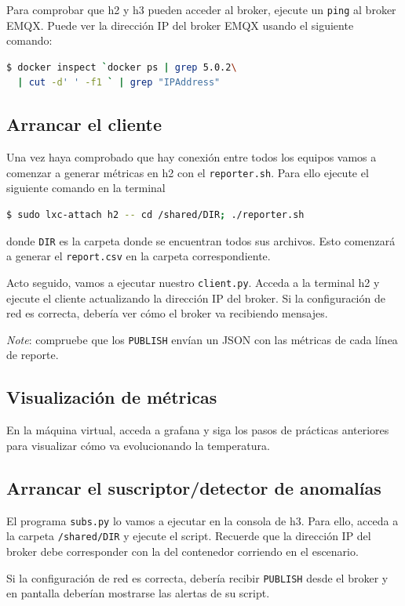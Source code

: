 \documentclass{upmassignment}
\begin{document}
Para comprobar que h2 y h3 pueden
acceder al broker,
ejecute un \texttt{ping}
al broker EMQX.
Puede ver la dirección IP del broker
EMQX usando el siguiente comando:
\begin{lstlisting}[language=bash]
$ docker inspect `docker ps | grep 5.0.2\
  | cut -d' ' -f1 ` | grep "IPAddress"
\end{lstlisting}



\subsection*{Arrancar el cliente}
Una vez haya comprobado que hay
conexión entre todos los equipos
vamos a comenzar a generar métricas en h2
con el \texttt{reporter.sh}.
Para ello ejecute el siguiente comando
en la terminal
\begin{lstlisting}[language=bash]
$ sudo lxc-attach h2 -- cd /shared/DIR; ./reporter.sh
\end{lstlisting}
donde \texttt{DIR} es la carpeta donde
se encuentran todos sus archivos.
Esto comenzará a generar el
\texttt{report.csv} en la carpeta 
correspondiente.

Acto seguido, vamos a ejecutar nuestro
\texttt{client.py}. Acceda a la terminal
h2 y ejecute el cliente actualizando
la dirección IP del broker.
Si la configuración de red es correcta,
debería ver cómo el broker va recibiendo
mensajes.

\emph{Note}: compruebe que los
\texttt{PUBLISH} envían un JSON con
las métricas de cada línea de reporte.


\subsection*{Visualización de métricas}
En la máquina virtual, acceda a grafana
y siga los pasos de prácticas anteriores
para visualizar cómo va evolucionando
la temperatura.


\subsection*{Arrancar el
suscriptor/detector de anomalías}
El programa \texttt{subs.py} lo vamos
a ejecutar en la consola de h3.
Para ello, acceda a la carpeta
\texttt{/shared/DIR} y ejecute el
script. Recuerde que la dirección IP del
broker debe corresponder con la del
contenedor corriendo en el escenario.

Si la configuración de red es correcta,
debería recibir \texttt{PUBLISH}
desde el broker y en pantalla deberían
mostrarse las alertas de su script.
\end{document}
